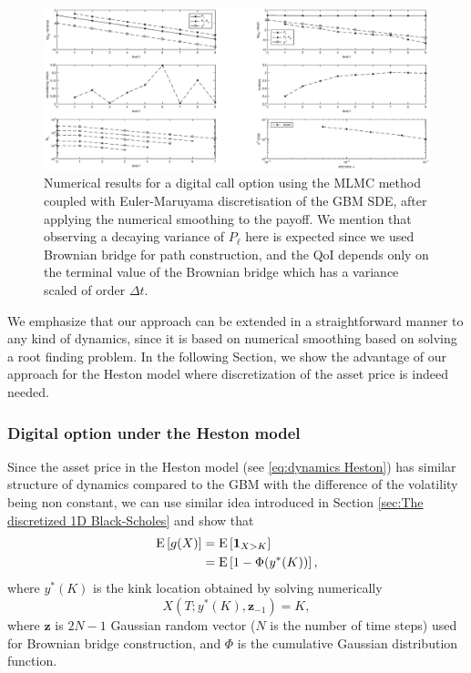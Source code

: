 \FloatBarrier
	\begin{figure}[h!]
\centering
\includegraphics[width=1.2\linewidth]{./figures/MLMC_binary_GBM_opt/digital_option_with_smoothing_L_0_2_steps}

\caption{Numerical results for a digital call option using the MLMC method coupled with Euler-Maruyama discretisation of the GBM SDE, after applying  the numerical smoothing to the payoff. We mention that observing a decaying variance of $P_{\ell}$ here is expected since we used Brownian bridge for path construction, and the QoI depends only on the terminal value of the Brownian bridge which has a variance scaled of order $\Delta t$.}
\label{fig:euler_digital_with_smoothing}
\end{figure}
\FloatBarrier
We emphasize that our approach can be extended in a straightforward manner to any kind of dynamics, since it is based on numerical smoothing based on solving a root finding problem.  In the following Section, we show the advantage of our approach for the Heston model where discretization of the asset price is indeed needed.
\subsubsection{Digital option under the Heston model}\label{sec:Digital option under the Heston model}

Since the asset price in the  Heston model (see \eqref{eq:dynamics Heston})   has similar structure of dynamics compared to the GBM with the difference of the volatility being non constant, we can use  similar idea introduced in Section \ref{sec:The discretized 1D Black-Scholes} and show that
\begin{align}
\mathrm{E}\left[g(X)\right]&=\mathrm{E}\left[\mathbf{1}_{X>K}\right]\nonumber\\
&=\mathrm{E}\left[1-\Phi(y^\ast(K))\right],
\end{align}
where $y^\ast(K)$ is the kink location obtained by solving numerically 
$$X(T; y^\ast(K), \mathbf{z}_{-1})=K,$$
where  $\mathbf{z}$ is $2N-1$ Gaussian random  vector ($N$ is the number of time steps) used for Brownian bridge construction, and $\Phi$ is the cumulative Gaussian distribution function.

